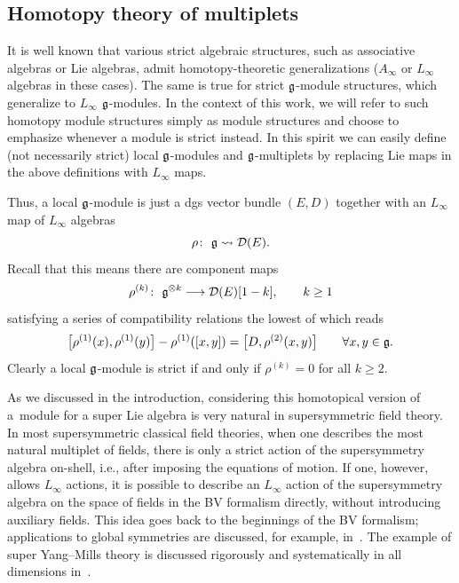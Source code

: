 \documentclass[11pt]{article}
\numberwithin{equation}{section}
\numberwithin{equation}{section}
\begin{document}
\subsection{Homotopy theory of multiplets}
%
It is well known that various strict algebraic structures, such as associative algebras or Lie algebras, admit homotopy-theoretic generalizations ($A_\infty$ or $L_\infty$ algebras in these cases). The same is true for strict $\mathfrak g$-module structures,
which generalize to $L_\infty$ $\mathfrak g$-modules. In the context of this work, we will refer to such homotopy module structures simply as module structures and choose to emphasize whenever a module is strict instead. In this spirit we can easily define (not necessarily strict) local $\mathfrak g$-modules and $\mathfrak g$-multiplets by replacing Lie maps in the above definitions with $L_\infty$ maps.

Thus, a local $\mathfrak g$-module is just a dgs vector bundle $(E,D)$ together with an $L_\infty$ map of $L_\infty$ algebras
\begin{equation*}
\rho \colon \ \mathfrak g \rightsquigarrow \mathcal D(E) .
\end{equation*}
Recall that this means there are component maps
\begin{equation*}
\rho^{(k)} \colon \ \mathfrak g^{\otimes k} \longrightarrow \mathcal D(E)[1-k], \qquad k \geq 1
\end{equation*}
satisfying a series of compatibility relations the lowest of which reads
\begin{equation*}%
\big[\rho^{(1)}(x),\rho^{(1)}(y)\big] - \rho^{(1)}([x,y]) =\big[D, \rho^{(2)}(x,y)\big] \qquad \forall x,y \in \fg.
\end{equation*}
Clearly a local $\mathfrak g$-module is strict if and only if $\rho^{(k)} = 0$ for all $k\geq2$.

\begin{rmk}
	As we discussed in the introduction, considering this homotopical version of a~module for a super Lie algebra is very natural in supersymmetric field theory. In most supersymmetric classical field theories, when one describes the most natural multiplet of fields, there is only a strict action of the supersymmetry algebra on-shell, i.e., after imposing the equations of motion. If one, however, allows $L_\infty$ actions, it is possible to describe an $L_\infty$ action of the supersymmetry algebra on the space of fields in the BV formalism directly, without introducing auxiliary fields. This idea goes back to the beginnings of the BV formalism; applications to global symmetries are discussed, for example, in~\cite{BaulieuSusy}. The example of super Yang--Mills theory is discussed rigorously and systematically in all dimensions in~\cite{ESW}.
\end{rmk}
\end{document}
